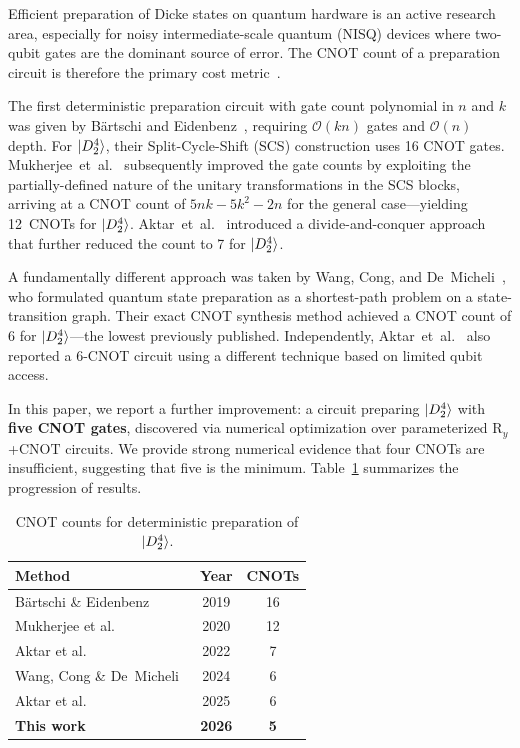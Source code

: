 \documentclass[twocolumn,10pt]{article}
\newcommand{\Ry}{\mathrm{R}_y}
\newcommand{\CNOT}{\mathrm{CNOT}}
\begin{document}
Efficient preparation of Dicke states on quantum hardware is an active
research area, especially for noisy intermediate-scale quantum (NISQ)
devices where two-qubit gates are the dominant source of error. The
CNOT count of a preparation circuit is therefore the primary cost
metric~\cite{bartschi2019,mukherjee2020,wang2024}.

The first deterministic preparation circuit with gate count polynomial in $n$
and $k$ was given by B\"artschi and Eidenbenz~\cite{bartschi2019}, requiring
$\mathcal{O}(kn)$ gates and $\mathcal{O}(n)$ depth. For $\ket{D_2^4}$, their
Split-Cycle-Shift (SCS) construction uses 16 CNOT gates.
Mukherjee~et~al.~\cite{mukherjee2020} subsequently improved the gate counts by
exploiting the partially-defined nature of the unitary transformations in the
SCS blocks, arriving at a CNOT count of $5nk - 5k^2 - 2n$ for the
general case---yielding 12~CNOTs for $\ket{D_2^4}$.
Aktar~et~al.~\cite{aktar2022} introduced a divide-and-conquer approach that
further reduced the count to 7 for $\ket{D_2^4}$.

A fundamentally different approach was taken by Wang, Cong, and
De~Micheli~\cite{wang2024}, who formulated quantum state preparation as a
shortest-path problem on a state-transition graph. Their exact CNOT synthesis
method achieved a CNOT count of 6 for
$\ket{D_2^4}$---the lowest previously published. Independently,
Aktar~et~al.~\cite{aktar2025} also reported a 6-CNOT circuit using a
different technique based on limited qubit access.

In this paper, we report a further improvement: a circuit preparing
$\ket{D_2^4}$ with \textbf{five CNOT gates}, discovered via numerical
optimization over parameterized $\Ry$+$\CNOT$ circuits. We provide strong
numerical evidence that four CNOTs are insufficient, suggesting that five is
the minimum. Table~\ref{tab:comparison} summarizes the progression of results.

\begin{table}[b]
\centering
\caption{CNOT counts for deterministic preparation of $\ket{D_2^4}$.}
\label{tab:comparison}
\begin{tabular}{lcc}
\toprule
Method & Year & CNOTs \\
\midrule
B\"artschi \& Eidenbenz~\cite{bartschi2019} & 2019 & 16 \\
Mukherjee et al.~\cite{mukherjee2020} & 2020 & 12 \\
Aktar et al.~\cite{aktar2022} & 2022 & 7 \\
Wang, Cong \& De~Micheli~\cite{wang2024} & 2024 & 6 \\
Aktar et al.~\cite{aktar2025} & 2025 & 6 \\
\textbf{This work} & \textbf{2026} & \textbf{5} \\
\bottomrule
\end{tabular}
\end{table}
\end{document}
